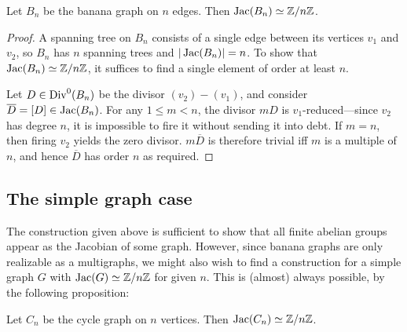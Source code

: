 \documentclass{amsart}
\begin{document}
\begin{center}
\end{center}

\begin{prop}
  \label{prop:banana_cyclic}
  Let $B_n$ be the banana graph on $n$ edges. Then $\operatorname{Jac}(B_n) \simeq \mathbb{Z}/n\mathbb{Z}$.
\end{prop}

\begin{proof}
  A spanning tree on $B_n$ consists of a single edge between its
  vertices $v_1$ and $v_2$, so $B_n$ has $n$ spanning trees and
  $|\operatorname{Jac}(B_n)| = n$. To show that $\operatorname{Jac}(B_n) \simeq \mathbb{Z}/n\mathbb{Z}$, it
  suffices to find a single element of order at least $n$.

  Let $D \in \operatorname{Div}^0(B_n)$ be the divisor $(v_2) - (v_1)$, and consider
  $\overline{D} = [D] \in \operatorname{Jac}(B_n)$. For any $1 \le m < n$, the
  divisor $mD$ is $v_1$-reduced---since $v_2$ has degree $n$, it is
  impossible to fire it without sending it into debt. If $m=n$, then
  firing $v_2$ yields the zero divisor. $m\overline{D}$ is therefore
  trivial iff $m$ is a multiple of $n$, and hence $\overline{D}$ has
  order $n$ as required.
\end{proof}

\subsection{The simple graph case}
The construction given above is sufficient to show that all finite
abelian groups appear as the Jacobian of some graph. However, since
banana graphs are only realizable as a multigraphs, we might also wish
to find a construction for a simple graph $G$ with $\operatorname{Jac}(G) \simeq
\mathbb{Z}/n\mathbb{Z}$ for given $n$. This is (almost) always possible, by the
following proposition:

\begin{prop}
  \label{prop:cycle_cyclic}
  Let $C_n$ be the cycle graph on $n$ vertices. Then $\operatorname{Jac}(C_n) \simeq
  \mathbb{Z}/n\mathbb{Z}$.
\end{prop}
\end{document}
